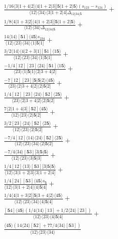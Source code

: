 \documentclass[varwidth, border=5pt]{standalone}
\begin{document}
\begin{my}
$\begin{gathered}
\scriptscriptstyle\frac{1/16⟨3|1+4|2]⟨4|1+2|3][𝟓|1+2|𝟓⟩(s_{123}-s_{124})}{⟨12⟩⟨34⟩⟨3|1+2|4]Δ_{12|34|𝟓}} +\\
\scriptscriptstyle\frac{1/8⟨4|1+3|2]⟨4|1+2|3][𝟓|1+2|𝟓⟩}{⟨12⟩⟨34⟩Δ_{12|34|𝟓}} +\\
\scriptscriptstyle\frac{14⟨14⟩[𝟓1]⟨4𝟓⟩s_{234}}{⟨12⟩⟨23⟩⟨34⟩⟨1|𝟓|1]} +\\
\scriptscriptstyle\frac{3/2⟨14⟩⟨4|2+3|1][𝟓1]⟨1𝟓⟩}{⟨12⟩⟨23⟩⟨34⟩⟨1|𝟓|1]} +\\
\scriptscriptstyle\frac{-1/4[12][23]⟨24⟩[𝟓1]⟨1𝟓⟩}{⟨23⟩⟨1|𝟓|1]⟨2|3+4|2]} +\\
\scriptscriptstyle\frac{-7[12][23][𝟓|𝟓|2⟩⟨4𝟓⟩}{⟨23⟩⟨2|3+4|2]⟨2|𝟓|2]} +\\
\scriptscriptstyle\frac{1/4[12][23]⟨24⟩[𝟓2]⟨2𝟓⟩}{⟨23⟩⟨2|3+4|2]⟨2|𝟓|2]} +\\
\scriptscriptstyle\frac{7⟨2|1+4|3][𝟓2]⟨4𝟓⟩}{⟨12⟩⟨23⟩⟨2|𝟓|2]} +\\
\scriptscriptstyle\frac{3/2[23]⟨24⟩[𝟓2]⟨2𝟓⟩}{⟨12⟩⟨23⟩⟨2|𝟓|2]} +\\
\scriptscriptstyle\frac{-7/4[12]⟨14⟩⟨24⟩[𝟓2]⟨2𝟓⟩}{⟨12⟩⟨23⟩⟨34⟩⟨2|𝟓|2]} +\\
\scriptscriptstyle\frac{-7/4⟨34⟩[𝟓3][3|𝟓|𝟓⟩}{⟨12⟩⟨23⟩⟨3|𝟓|3]} +\\
\scriptscriptstyle\frac{1/4[12]⟨13⟩[𝟓3][3|𝟓|𝟓⟩}{⟨12⟩⟨3|1+2|3]⟨3|1+2|4]} +\\
\scriptscriptstyle\frac{1/4[24][𝟓3]⟨4𝟓⟩s_{𝟓}}{⟨12⟩⟨3|1+2|4]⟨4|𝟓|4]} +\\
\scriptscriptstyle\frac{1/4⟨4|1+3|2][𝟓|3+4|2⟩⟨4𝟓⟩}{⟨12⟩⟨23⟩⟨34⟩⟨4|𝟓|4]} +\\
\scriptscriptstyle\frac{[𝟓4]⟨4𝟓⟩(1/4⟨14⟩[13]+1/2⟨24⟩[23])}{⟨12⟩⟨23⟩⟨4|𝟓|4]} +\\
\scriptscriptstyle\frac{⟨4𝟓⟩(14⟨24⟩[𝟓2]+77/4⟨34⟩[𝟓3])}{⟨12⟩⟨23⟩⟨34⟩} \phantom{+}
\end{gathered}$
\end{my}
\end{document}
